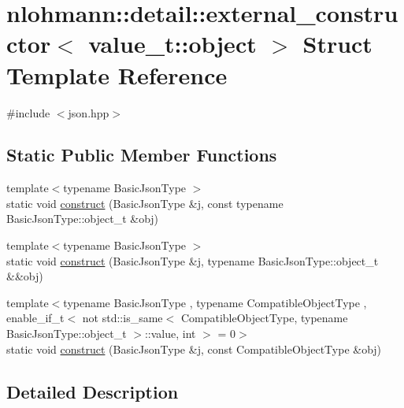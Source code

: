 \hypertarget{structnlohmann_1_1detail_1_1external__constructor_3_01value__t_1_1object_01_4}{}\section{nlohmann\+:\+:detail\+:\+:external\+\_\+constructor$<$ value\+\_\+t\+:\+:object $>$ Struct Template Reference}
\label{structnlohmann_1_1detail_1_1external__constructor_3_01value__t_1_1object_01_4}


{\ttfamily \#include $<$json.\+hpp$>$}

\subsection*{Static Public Member Functions}
\begin{DoxyCompactItemize}
\item 
{\footnotesize template$<$typename Basic\+Json\+Type $>$ }\\static void \hyperlink{structnlohmann_1_1detail_1_1external__constructor_3_01value__t_1_1object_01_4_a3a369c5d49596dd4411e368425f9ac7a}{construct} (Basic\+Json\+Type \&j, const typename Basic\+Json\+Type\+::object\+\_\+t \&obj)
\item 
{\footnotesize template$<$typename Basic\+Json\+Type $>$ }\\static void \hyperlink{structnlohmann_1_1detail_1_1external__constructor_3_01value__t_1_1object_01_4_a1e044961affbd6417386d6e9f1d545e9}{construct} (Basic\+Json\+Type \&j, typename Basic\+Json\+Type\+::object\+\_\+t \&\&obj)
\item 
{\footnotesize template$<$typename Basic\+Json\+Type , typename Compatible\+Object\+Type , enable\+\_\+if\+\_\+t$<$ not std\+::is\+\_\+same$<$ Compatible\+Object\+Type, typename Basic\+Json\+Type\+::object\+\_\+t $>$\+::value, int $>$  = 0$>$ }\\static void \hyperlink{structnlohmann_1_1detail_1_1external__constructor_3_01value__t_1_1object_01_4_a91f89abe0ec4dec59099b691682ff927}{construct} (Basic\+Json\+Type \&j, const Compatible\+Object\+Type \&obj)
\end{DoxyCompactItemize}


\subsection{Detailed Description}
